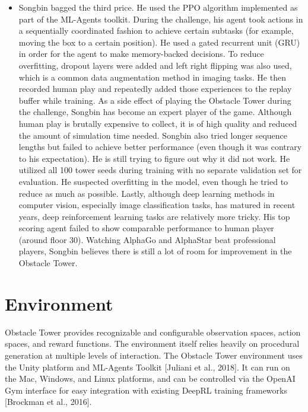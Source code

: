 \documentclass[conference]{IEEEtran}
\begin{document}
\begin{itemize}
\item Songbin bagged the third price. He used the PPO algorithm implemented as part of the ML-Agents toolkit. During the challenge, his agent took actions in a sequentially coordinated fashion to achieve certain subtasks (for example, moving the box to a certain position). He used a gated recurrent unit (GRU) in order for the agent to make memory-backed decisions. To reduce overfitting, dropout layers were added and left right flipping was also used, which is a common data augmentation method in imaging tasks. He then recorded human play and repeatedly added those experiences to the replay buffer while training. As a side effect of playing the Obstacle Tower during the challenge, Songbin has become an expert player of the game. Although human play is brutally expensive to collect, it is of high quality and reduced the amount of simulation time needed. Songbin also tried longer sequence lengths but failed to achieve better performance (even though it was contrary to his expectation). He is still trying to figure out why it did not work. He utilized all 100 tower seeds during training with no separate validation set for evaluation. He suspected overfitting in the model, even though he tried to reduce as much as possible.
Lastly, although deep learning methods in computer vision, especially image classification tasks, has matured in recent years, deep reinforcement learning tasks are relatively more tricky. His top scoring agent failed to show comparable performance to human player (around floor 30). Watching AlphaGo and AlphaStar beat professional players, Songbin believes there is still a lot of room for improvement in the Obstacle Tower.
\end{itemize}

\section{Environment}
Obstacle Tower provides recognizable and configurable observation spaces, action spaces, and reward functions. The environment itself relies heavily on procedural generation at multiple levels of interaction. The Obstacle Tower environment uses the Unity platform and ML-Agents Toolkit [Juliani et al., 2018]. It can run on the Mac, Windows, and Linux platforms, and can be controlled via the OpenAI Gym interface for easy integration with existing DeepRL training frameworks [Brockman et al., 2016].
\end{document}
